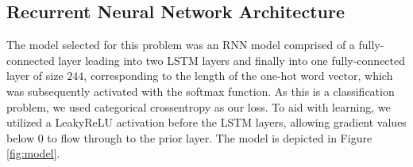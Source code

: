 \documentclass[conference]{IEEEtran}
\begin{document}
\subsection{Recurrent Neural Network Architecture}

The model selected for this problem was an RNN model comprised of a fully-connected layer leading into two LSTM layers and finally into one fully-connected layer of size $244$, corresponding to the length of the one-hot word vector, which was subsequently activated with the softmax function.  As this is a classification problem, we used categorical crossentropy as our loss.  To aid with learning, we utilized a LeakyReLU activation before the LSTM layers, allowing gradient values below $0$ to flow through to the prior layer.  The model is depicted in Figure \ref{fig:model}.
\end{document}
